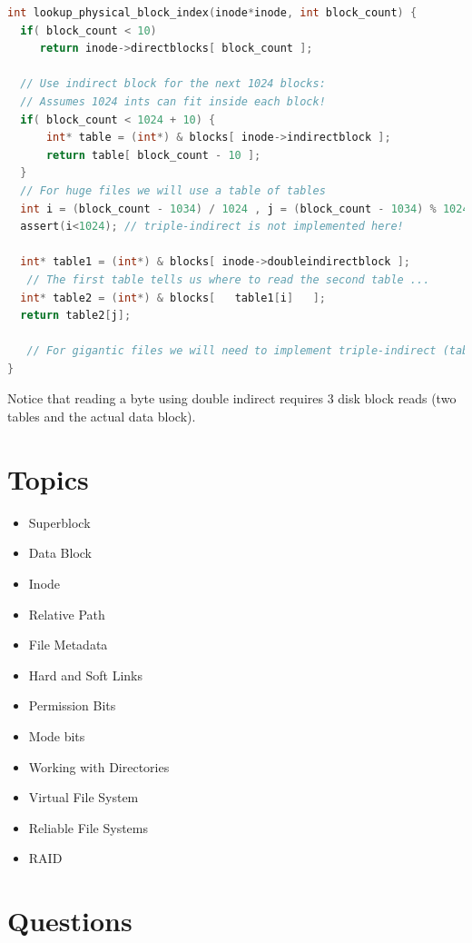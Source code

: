 \begin{lstlisting}[language=C]
int lookup_physical_block_index(inode*inode, int block_count) {
  if( block_count < 10)
     return inode->directblocks[ block_count ];

  // Use indirect block for the next 1024 blocks:
  // Assumes 1024 ints can fit inside each block!
  if( block_count < 1024 + 10) {
      int* table = (int*) & blocks[ inode->indirectblock ];
      return table[ block_count - 10 ];
  }
  // For huge files we will use a table of tables
  int i = (block_count - 1034) / 1024 , j = (block_count - 1034) % 1024;
  assert(i<1024); // triple-indirect is not implemented here!

  int* table1 = (int*) & blocks[ inode->doubleindirectblock ];
   // The first table tells us where to read the second table ...
  int* table2 = (int*) & blocks[   table1[i]   ];
  return table2[j];

   // For gigantic files we will need to implement triple-indirect (table of tables of tables)
}
\end{lstlisting}

Notice that reading a byte using double indirect requires 3 disk block reads (two tables and the actual data block).

\section{Topics}\label{topics}

\begin{itemize}
\tightlist
\item
  Superblock
\item
  Data Block
\item
  Inode
\item
  Relative Path
\item
  File Metadata
\item
  Hard and Soft Links
\item
  Permission Bits
\item
  Mode bits
\item
  Working with Directories
\item
  Virtual File System
\item
  Reliable File Systems
\item
  RAID
\end{itemize}

\section{Questions}\label{questions}

